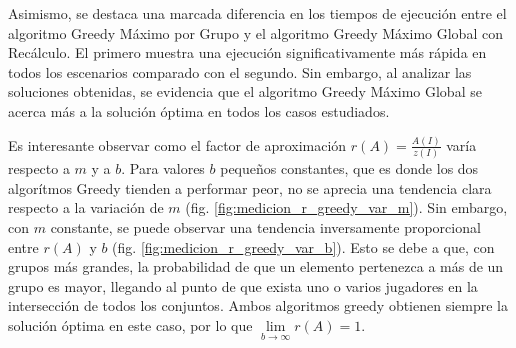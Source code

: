 Asimismo, se destaca una marcada diferencia en los tiempos de ejecución entre el algoritmo Greedy Máximo por Grupo y el algoritmo Greedy Máximo Global con Recálculo. El primero muestra una ejecución significativamente más rápida en todos los escenarios comparado con el segundo. Sin embargo, al analizar las soluciones obtenidas, se evidencia que el algoritmo Greedy Máximo Global se acerca más a la solución óptima en todos los casos estudiados.

Es interesante observar como el factor de aproximación $r(A)=\frac{A(I)}{z(I)}$ varía respecto a $m$ y a $b$. Para valores $b$ pequeños constantes, que es donde los dos algorítmos Greedy tienden a performar peor, no se aprecia una tendencia clara respecto a la variación de $m$ (fig. \ref{fig:medicion_r_greedy_var_m}). Sin embargo, con $m$ constante, se puede observar una tendencia inversamente proporcional entre $r(A)$ y $b$ (fig. \ref{fig:medicion_r_greedy_var_b}). Esto se debe a que, con grupos más grandes, la probabilidad de que un elemento pertenezca a más de un grupo es mayor, llegando al punto de que exista uno o varios jugadores en la intersección de todos los conjuntos. Ambos algoritmos greedy obtienen siempre la solución óptima en este caso, por lo que $\lim\limits_{b \rightarrow \infty}r(A)=1$.

